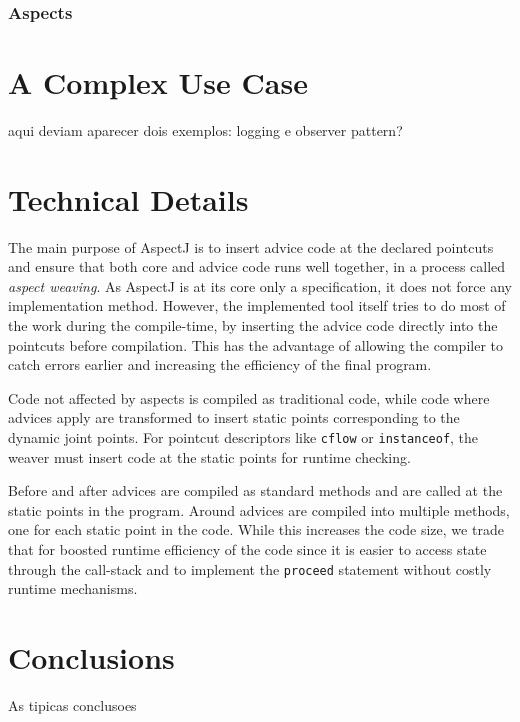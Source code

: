 \documentclass{template}
\begin{document}
\subsubsection{Aspects}

\section{A Complex Use Case}

aqui deviam aparecer dois exemplos: logging e observer pattern?

\section{Technical Details}

The main purpose of AspectJ is to insert advice code at the declared pointcuts and ensure that
both core and advice code runs well together, in a process called \emph{aspect weaving}.
As AspectJ is at its core only a specification, it does not force any implementation method.
However, the implemented tool itself tries to do most of the work during the compile-time, by
inserting the advice code directly into the pointcuts before compilation. This has the advantage of
allowing the compiler to catch errors earlier and increasing the efficiency of the final program.

Code not affected by aspects is compiled as traditional code, while code where advices apply are
transformed to insert static points corresponding to the dynamic joint points.
For pointcut descriptors like \texttt{cflow} or \texttt{instanceof}, the weaver must insert
code at the static points for runtime checking.

Before and after advices are compiled as standard methods and are called at the static points in
the program. Around advices are compiled into multiple methods, one for each static point in the code.
While this increases the code size, we trade that for boosted runtime efficiency of the code since
it is easier to access state through the call-stack and to implement the \texttt{proceed} statement
without costly runtime mechanisms.

\section{Conclusions}

As tipicas conclusoes \cite{Kiczales97aspect-orientedprogramming}




\balancecolumns
\end{document}
